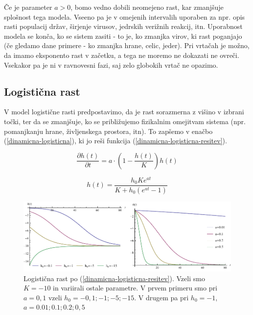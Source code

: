 \documentclass[a4paper, oneside, 12pt]{book}
\begin{document}
          Če je parameter $a > 0$, bomo vedno dobili neomejeno rast, kar zmanjšuje splošnost tega modela. Vseeno pa je v omejenih intervalih uporaben za npr. opis rasti populacij držav, širjenje virusov, jedrskih verižnih reakcij, itn. Uporabnost modela se konča, ko se sistem zasiti - to je, ko zmanjka virov, ki rast poganjajo (če gledamo dane primere - ko zmanjka hrane, celic, jeder).
          Pri vrtačah je možno, da imamo eksponento rast v začetku, a tega ne moremo ne dokazati ne ovreči. Vsekakor pa je ni v ravnovesni fazi, saj zelo globokih vrtač ne opazimo.


          \subsection{Logistična rast}

          V model logistične rasti predpostavimo, da je rast sorazmerna z višino v izbrani točki, ter da se zmanjšuje, ko se približujemo fizikalnim omejitvam sistema (npr. pomanjkanju hrane, življenskega prostora, itn). To zapšemo v enačbo (\ref{dinamicna-logisticna}), ki jo reši funkcija (\ref{dinamicna-logisticna-resitev}).

          \begin{equation}
            \frac{\partial h(t)}{\partial t} = a \cdot \left( 1 - \frac{h(t)}{K} \right) h(t)
            \label{dinamicna-logisticna}
          \end{equation}

            \begin{equation}
            h(t) = \frac{h_0 K e^{a t}}{K + h_0 (e^{a t}-1)}
            \label{dinamicna-logisticna-resitev}
          \end{equation}

            \begin{figure}[h]
              \begin{center}
                \includegraphics[width=14cm]{slike/logisticna-rast}
              \end{center}
              \caption{Logistična rast po (\ref{dinamicna-logisticna-resitev}). Vzeli smo $K=-10$ in variirali ostale parametre. V prvem primeru smo pri $a=0,1$ vzeli $h_0=-0,1;-1;-5;-15$. V drugem pa pri $h_0=-1$, $a=0.01;0.1;0.2;0,5$}
              \label{fig:logisticna-rast}
            \end{figure}
\end{document}
